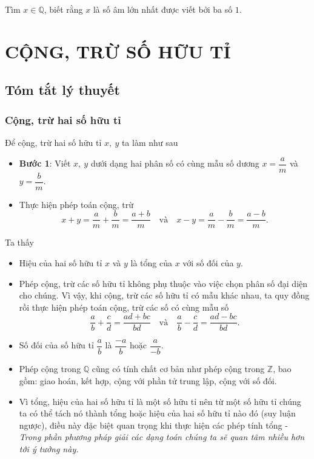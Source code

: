 \begin{bt}%
	Tìm $x\in\mathbb{Q}$, biết rằng $x$ là số âm lớn nhất được viết bởi ba số $1$.
\end{bt}

\section{CỘNG, TRỪ SỐ HỮU TỈ}
\subsection{Tóm tắt lý thuyết}
\subsubsection{Cộng, trừ hai số hữu tỉ}
Để cộng, trừ hai số hữu tỉ $x,\ y$ ta làm như sau
\begin{itemize}
	\item \textbf{Bước 1}: Viết $x,\ y$ dưới dạng hai phân số có cùng mẫu số dương $x=\dfrac{a}{m}$ và $y=\dfrac{b}{m}$.
	\item Thực hiện phép toán cộng, trừ
	$$x+y=\dfrac{a}{m}+\dfrac{b}{m}=\dfrac{a+b}{m}\quad \text{và}\quad x-y=\dfrac{a}{m}-\dfrac{b}{m}=\dfrac{a-b}{m}.$$
\end{itemize}

\begin{nx}{Ta thấy}
\begin{itemize}
	\item Hiệu của hai số hữu tỉ $x$ và $y$ là tổng của $x$ với số đối của $y$.
	\item Phép cộng, trừ các số hữu tỉ không phụ thuộc vào việc chọn phân số đại diện cho chúng. Vì vậy, khi cộng, trừ các số hữu tỉ có mẫu khác nhau, ta quy đồng rồi thực hiện phép toán cộng, trừ các số có cùng mẫu số
	$$\dfrac{a}{b}+\dfrac{c}{d}=\dfrac{ad+bc}{bd}\quad \text{và}\quad \dfrac{a}{b}-\dfrac{c}{d}=\dfrac{ad-bc}{bd}.$$
	\item Số đối của số hữu tỉ $\dfrac{a}{b}$ là $\dfrac{-a}{b}$ hoặc $\dfrac{a}{-b}$.
	\item Phép cộng trong $\mathbb{Q}$ cũng có tính chất cơ bản như phép cộng trong $\mathbb{Z}$, bao gồm: giao hoán, kết hợp, cộng với phần tử trung lập, cộng với số đối.
	\item Vì tổng, hiệu của hai số hữu tỉ là một số hữu tỉ nên từ một số hữu tỉ chúng ta có thể tách nó thành tổng hoặc hiệu của hai số hữu tỉ nào đó (suy luận ngược), điều này đặc biệt quan trọng khi thực hiện các phép tính tổng - \textit{Trong phần phương pháp giải các dạng toán chúng ta sẽ quan tâm nhiều hơn tới ý tưởng này.}
\end{itemize}
\end{nx}
